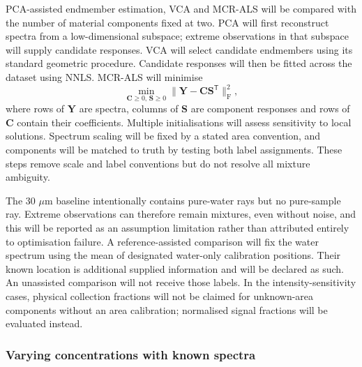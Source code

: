 \documentclass[11pt]{article}
\begin{document}
PCA-assisted endmember estimation, VCA and MCR-ALS will be compared with the number of material components fixed at two. PCA will first reconstruct spectra from a low-dimensional subspace; extreme observations in that subspace will supply candidate responses. VCA will select candidate endmembers using its standard geometric procedure. Candidate responses will then be fitted across the dataset using NNLS. MCR-ALS will minimise
\begin{equation}
 \min_{\mathbf C\geq0,\,\mathbf S\geq0}
 \|\mathbf Y-\mathbf C\mathbf S^{\mathsf T}\|_{\mathrm F}^{2},
 \label{eq:mcr}
\end{equation}
where rows of $\mathbf Y$ are spectra, columns of $\mathbf S$ are component responses and rows of $\mathbf C$ contain their coefficients. Multiple initialisations will assess sensitivity to local solutions. Spectrum scaling will be fixed by a stated area convention, and components will be matched to truth by testing both label assignments. These steps remove scale and label conventions but do not resolve all mixture ambiguity.

The 30 $\mu\mathrm m$ baseline intentionally contains pure-water rays but no pure-sample ray. Extreme observations can therefore remain mixtures, even without noise, and this will be reported as an assumption limitation rather than attributed entirely to optimisation failure. A reference-assisted comparison will fix the water spectrum using the mean of designated water-only calibration positions. Their known location is additional supplied information and will be declared as such. An unassisted comparison will not receive those labels. In the intensity-sensitivity cases, physical collection fractions will not be claimed for unknown-area components without an area calibration; normalised signal fractions will be evaluated instead.

\subsubsection{Varying concentrations with known spectra}
\end{document}
